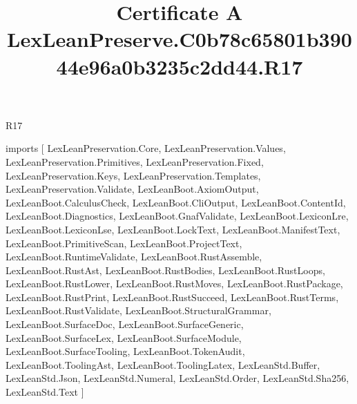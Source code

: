 \begin{lexlean}{R17}
\title{Certificate A LexLeanPreserve.C0b78c65801b39044e96a0b3235c2dd44.R17}
\begin{coremodule}
imports [
  LexLeanPreservation.Core,
  LexLeanPreservation.Values,
  LexLeanPreservation.Primitives,
  LexLeanPreservation.Fixed,
  LexLeanPreservation.Keys,
  LexLeanPreservation.Templates,
  LexLeanPreservation.Validate,
  LexLeanBoot.AxiomOutput,
  LexLeanBoot.CalculusCheck,
  LexLeanBoot.CliOutput,
  LexLeanBoot.ContentId,
  LexLeanBoot.Diagnostics,
  LexLeanBoot.GnafValidate,
  LexLeanBoot.LexiconLre,
  LexLeanBoot.LexiconLse,
  LexLeanBoot.LockText,
  LexLeanBoot.ManifestText,
  LexLeanBoot.PrimitiveScan,
  LexLeanBoot.ProjectText,
  LexLeanBoot.RuntimeValidate,
  LexLeanBoot.RustAssemble,
  LexLeanBoot.RustAst,
  LexLeanBoot.RustBodies,
  LexLeanBoot.RustLoops,
  LexLeanBoot.RustLower,
  LexLeanBoot.RustMoves,
  LexLeanBoot.RustPackage,
  LexLeanBoot.RustPrint,
  LexLeanBoot.RustSucceed,
  LexLeanBoot.RustTerms,
  LexLeanBoot.RustValidate,
  LexLeanBoot.StructuralGrammar,
  LexLeanBoot.SurfaceDoc,
  LexLeanBoot.SurfaceGeneric,
  LexLeanBoot.SurfaceLex,
  LexLeanBoot.SurfaceModule,
  LexLeanBoot.SurfaceTooling,
  LexLeanBoot.TokenAudit,
  LexLeanBoot.ToolingAst,
  LexLeanBoot.ToolingLatex,
  LexLeanStd.Buffer,
  LexLeanStd.Json,
  LexLeanStd.Numeral,
  LexLeanStd.Order,
  LexLeanStd.Sha256,
  LexLeanStd.Text
]


\end{coremodule}
\end{lexlean}
